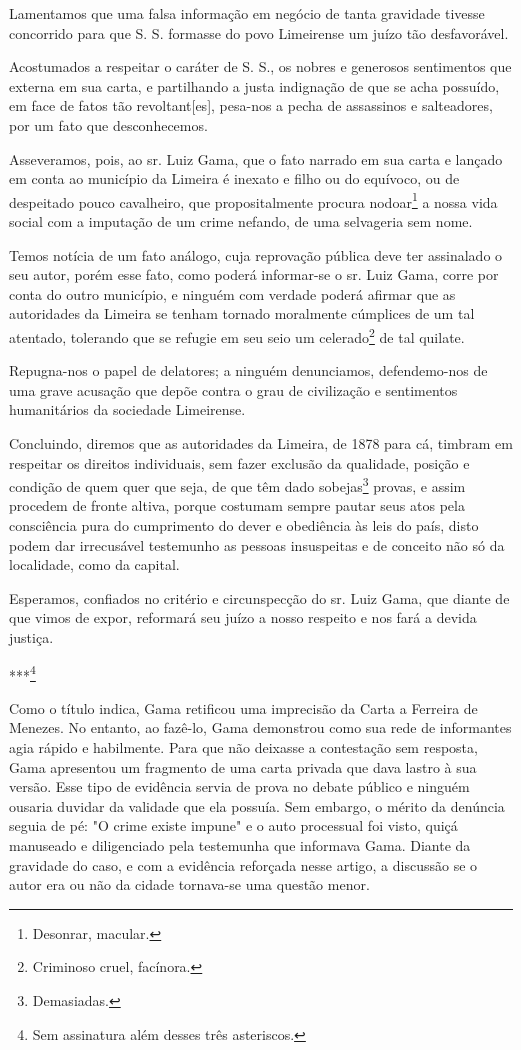 {Lamentamos que uma falsa informação em negócio de tanta gravidade
tivesse concorrido para que S. S. formasse do povo Limeirense um juízo
tão desfavorável.

Acostumados a respeitar o caráter de S. S., os nobres e generosos
sentimentos que externa em sua carta, e partilhando a justa indignação
de que se acha possuído, em face de fatos tão revoltant{[}es{]},
pesa-nos a pecha de assassinos e salteadores, por um fato que
desconhecemos.

Asseveramos, pois, ao sr. Luiz Gama, que o fato narrado em sua carta e
lançado em conta ao município da Limeira é inexato e filho ou do
equívoco, ou de despeitado pouco cavalheiro, que propositalmente procura
nodoar\footnote{Desonrar, macular.} a nossa vida social com a
imputação de um crime nefando, de uma selvageria sem nome.

Temos notícia de um fato análogo, cuja reprovação pública deve ter
assinalado o seu autor, porém esse fato, como poderá informar-se o sr.
Luiz Gama, corre por conta do outro município, e ninguém com verdade
poderá afirmar que as autoridades da Limeira se tenham tornado
moralmente cúmplices de um tal atentado, tolerando que se refugie em seu
seio um celerado\footnote{Criminoso cruel, facínora.} de tal quilate.

Repugna-nos o papel de delatores; a ninguém denunciamos, defendemo-nos
de uma grave acusação que depõe contra o grau de civilização e
sentimentos humanitários da sociedade Limeirense.

Concluindo, diremos que as autoridades da Limeira, de 1878 para cá,
timbram em respeitar os direitos individuais, sem fazer exclusão da
qualidade, posição e condição de quem quer que seja, de que têm dado
sobejas\footnote{Demasiadas.} provas, e assim procedem de fronte
altiva, porque costumam sempre pautar seus atos pela consciência pura do
cumprimento do dever e obediência às leis do país, disto podem dar
irrecusável testemunho as pessoas insuspeitas e de conceito não só da
localidade, como da capital.

Esperamos, confiados no critério e circunspecção do sr. Luiz Gama, que
diante de que vimos de expor, reformará seu juízo a nosso respeito e nos
fará a devida justiça.

***\footnote{Sem assinatura além desses três asteriscos.}

\pagebreak
\mbox{}\vfill
\thispagestyle{empty}

{\small\noindent
Como o título indica, Gama retificou uma imprecisão da Carta a
Ferreira de Menezes. No entanto, ao fazê-lo, Gama demonstrou como sua
rede de informantes agia rápido e habilmente. Para que não deixasse a
contestação sem resposta, Gama apresentou um fragmento de uma carta
privada que dava lastro à sua versão. Esse tipo de evidência servia de
prova no debate público e ninguém ousaria duvidar da validade que ela
possuía. Sem embargo, o mérito da denúncia seguia de pé: "O crime existe
impune" e o auto processual foi visto, quiçá manuseado e diligenciado
pela testemunha que informava Gama. Diante da gravidade do caso, e com a
evidência reforçada nesse artigo, a discussão se o autor era ou não da
cidade tornava-se uma questão menor. }

}
